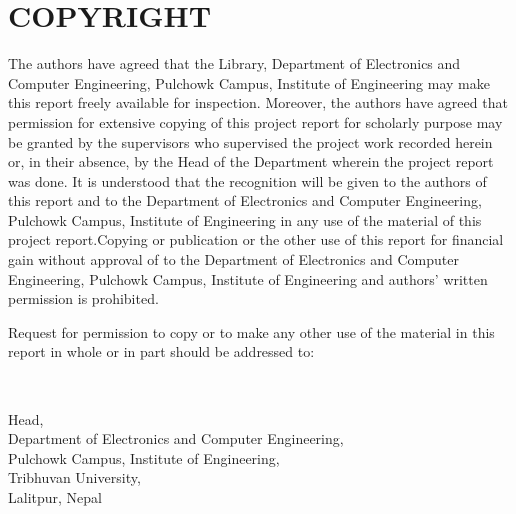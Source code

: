 
 {}
\section*{COPYRIGHT}

The authors have agreed that the Library, Department of Electronics and Computer Engineering, Pulchowk Campus, Institute of Engineering may make this report freely available for inspection. Moreover, the authors have agreed that permission for extensive copying of this project report for scholarly purpose may be granted by the supervisors who supervised the project work recorded herein or, in their absence, by the Head of the Department wherein the project report was done. It is understood that the recognition will be given to the
authors of this report and to the Department of Electronics and Computer Engineering, Pulchowk Campus, Institute of Engineering in any use of the material of this project report.Copying or publication or the other use of this report for financial gain without approval of to the Department of Electronics and Computer Engineering, Pulchowk Campus, Institute of
Engineering and authors' written permission is prohibited.

Request for permission to copy or to make any other use of the material in this report in whole or in part should be addressed to:

~

Head,\\
Department of Electronics and Computer Engineering,\\
Pulchowk Campus, Institute of Engineering,\\
Tribhuvan University,\\
Lalitpur, Nepal